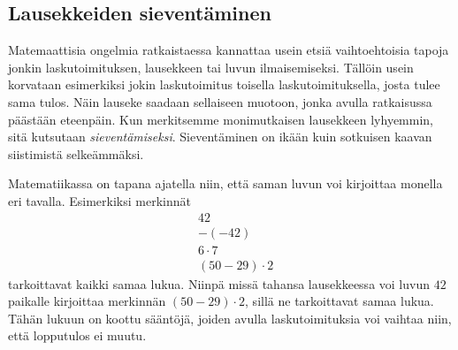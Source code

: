     
    


\subsection*{Lausekkeiden sieventäminen}

Matemaattisia ongelmia ratkaistaessa kannattaa usein etsiä vaihtoehtoisia tapoja jonkin laskutoimituksen, lausekkeen tai luvun ilmaisemiseksi. Tällöin usein korvataan esimerkiksi jokin laskutoimitus toisella laskutoimituksella, josta tulee sama tulos. Näin lauseke saadaan sellaiseen muotoon, jonka avulla ratkaisussa päästään eteenpäin. Kun merkitsemme monimutkaisen lausekkeen lyhyemmin, sitä kutsutaan \emph{sieventämiseksi}. Sieventäminen on ikään kuin sotkuisen kaavan siistimistä selkeämmäksi.

Matematiikassa on tapana ajatella niin, että saman luvun voi kirjoittaa monella eri tavalla. Esimerkiksi merkinnät \begin{align*}
                & 42 \\ & -(-42) \\ & 6 \cdot 7 \\ & (50-29) \cdot 2                                                                                                      
                                                                                                                 \end{align*}
tarkoittavat kaikki samaa lukua. Niinpä missä tahansa lausekkeessa voi luvun $42$ paikalle kirjoittaa merkinnän $(50-29)\cdot 2$, sillä ne tarkoittavat samaa lukua. Tähän lukuun on koottu sääntöjä, joiden avulla laskutoimituksia voi vaihtaa niin, että lopputulos ei muutu.

